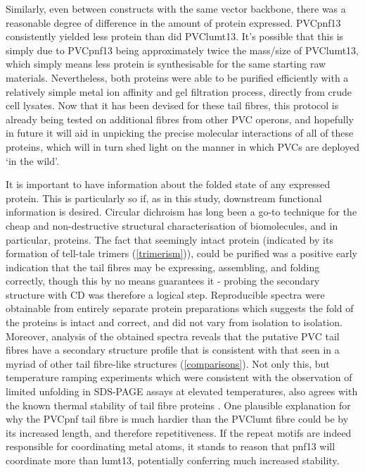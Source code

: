 Similarly, even between constructs with the same vector backbone, there was a reasonable degree of difference in the amount of protein expressed. PVCpnf13 consistently yielded less protein than did PVClumt13. It's possible that this is simply due to PVCpnf13 being approximately twice the mass/size of PVClumt13, which simply means less protein is synthesisable for the same starting raw materials. Nevertheless, both proteins were able to be purified efficiently with a relatively simple metal ion affinity and gel filtration process, directly from crude cell lysates. Now that it has been devised for these tail fibres, this protocol is already being tested on additional fibres from other PVC operons, and hopefully in future it will aid in unpicking the precise molecular interactions of all of these proteins, which will in turn shed light on the manner in which PVCs are deployed `in the wild'.

It is important to have information about the folded state of any expressed protein. This is particularly so if, as in this study, downstream functional information is desired. Circular dichroism has long been a go-to technique for the cheap and non-destructive structural characterisation of biomolecules, and in particular, proteins. The fact that seemingly intact protein (indicated by its formation of tell-tale trimers (\vref{trimerism})), could be purified was a positive early indication that the tail fibres may be expressing, assembling, and folding correctly, though this by no means guarantees it - probing the secondary structure with CD was therefore a logical step. Reproducible spectra were obtainable from entirely separate protein preparations which  suggests the fold of the proteins is intact and correct, and did not vary from isolation to isolation. Moreover, analysis of the obtained spectra reveals that the putative PVC tail fibres have a secondary structure profile that is consistent with that seen in a myriad of other tail fibre-like structures (\vref{comparisons}). Not only this, but temperature ramping experiments which were consistent with the observation of limited unfolding in SDS-PAGE assays at elevated temperatures, also agrees with the known thermal stability of tail fibre proteins \citep{Papanikolopoulou2004a, Papanikolopoulou2008, Gazit2008}. One plausible explanation for why the PVCpnf tail fibre is much hardier than the PVClumt fibre could be by its increased length, and therefore repetitiveness. If the repeat motifs are indeed responsible for coordinating metal atoms, it stands to reason that pnf13 will coordinate more than lumt13, potentially conferring much increased stability.

